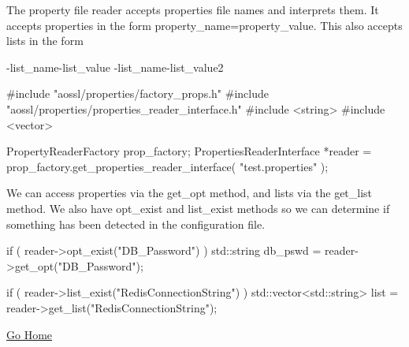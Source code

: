 The property file reader accepts properties file names and interprets them. It accepts properties in the form {\ttfamily property\+\_\+name=property\+\_\+value}. This also accepts lists in the form \begin{DoxyVerb}-list_name-list_value
-list_name-list_value2

#include "aossl/properties/factory_props.h"
#include "aossl/properties/properties_reader_interface.h"
#include <string>
#include <vector>

PropertyReaderFactory prop_factory;
PropertiesReaderInterface *reader = prop_factory.get_properties_reader_interface( "test.properties" );
\end{DoxyVerb}


We can access properties via the get\+\_\+opt method, and lists via the get\+\_\+list method. We also have opt\+\_\+exist and list\+\_\+exist methods so we can determine if something has been detected in the configuration file. \begin{DoxyVerb}if ( reader->opt_exist("DB_Password") ) {
  std::string db_pswd = reader->get_opt("DB_Password");
}

if ( reader->list_exist("RedisConnectionString") ) {
  std::vector<std::string> list = reader->get_list("RedisConnectionString");
}
\end{DoxyVerb}


\hyperlink{index}{Go Home} 